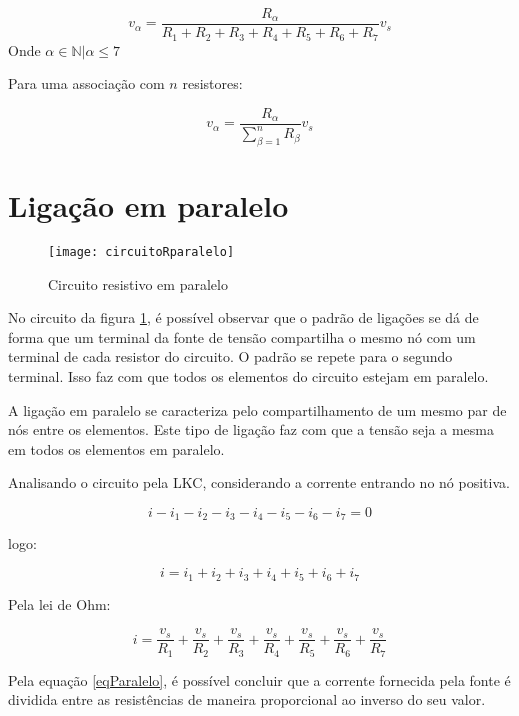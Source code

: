 \documentclass[12pt,fleqn]{book} %
\begin{document}
\begin{equation}
v_\alpha = \frac{R_\alpha}{R_1+R_2+R_3+R_4+R_5+R_6+R_7}v_s
\end{equation}
Onde $\alpha \in \mathbb{N} | \alpha \leq 7$

Para uma associação com $n$ resistores:

\begin{equation}
v_\alpha = \frac{R_\alpha}{\sum\limits_{\beta = 1}^{n}R_\beta}v_s
\end{equation}

\section{Ligação em paralelo}


        \begin{figure}[!htbp] \centering\texttt{[image: circuitoRparalelo]}
            \caption{Circuito resistivo em paralelo}\label{circuitoRparalelo} 
        \end{figure}

No circuito da figura \ref{circuitoRparalelo}, é possível observar que o padrão de ligações se dá de forma que um terminal da fonte de tensão compartilha o mesmo nó com um terminal de cada resistor do circuito. O padrão se repete para o segundo terminal. Isso faz com que todos os elementos do circuito estejam em paralelo.

A ligação em paralelo se caracteriza pelo compartilhamento de um mesmo par de nós entre os elementos. Este tipo de ligação faz com que a tensão seja a mesma em todos os elementos em paralelo. 

Analisando o circuito pela LKC, considerando a corrente entrando no nó positiva.

\begin{equation}
i-i_1-i_2-i_3-i_4-i_5-i_6-i_7=0
\end{equation}

logo:

\begin{equation}
i=i_1+i_2+i_3+i_4+i_5+i_6+i_7
\end{equation}

Pela lei de Ohm:

\begin{equation}\label{eqParalelo}
i= \frac{v_s}{R_1} + \frac{v_s}{R_2} +\frac{v_s}{R_3} +\frac{v_s}{R_4} +\frac{v_s}{R_5} +\frac{v_s}{R_6} +\frac{v_s}{R_7} 
\end{equation}

Pela equação \ref{eqParalelo}, é possível concluir que a corrente fornecida pela fonte é dividida entre as resistências de maneira proporcional ao inverso do seu valor.
\end{document}
